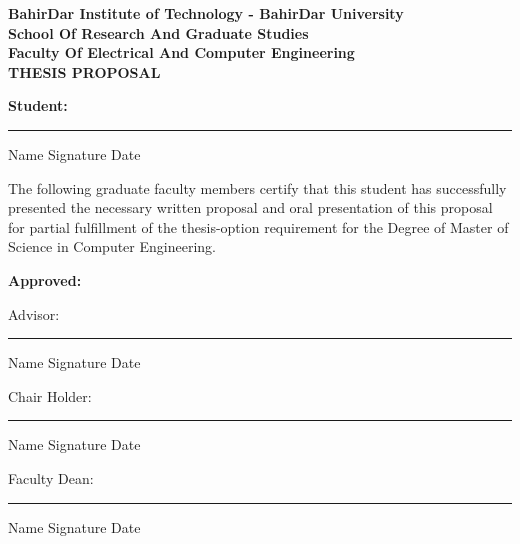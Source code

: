 \begin{center}
	{\large \bf BahirDar Institute of Technology - BahirDar University \\}
	{\large \bf School Of Research And Graduate Studies \\}
		\vspace{0.5\baselineskip}
	{\large \bf Faculty Of Electrical And Computer Engineering\\ }
	\vspace{2\baselineskip}
	{\large\bf THESIS PROPOSAL}
\end{center}

\begin{flushleft}
	{\bf Student: \\}
	\vspace{0.5\baselineskip}
	
	\noindent\rule{15cm}{0.4pt}
	Name \hfill Signature \hfill Date
	\vspace{\baselineskip}
	
	The following graduate faculty members certify that this student has successfully presented the necessary written proposal and oral presentation of this proposal for partial fulfillment of the thesis-option requirement for the Degree of Master of Science in Computer Engineering. 
	
	\vspace{1\baselineskip}
	
	{\bf Approved: \\}
	\vspace{0.5\baselineskip}
	
	Advisor:
	\vspace{0.5\baselineskip}
	\noindent\rule{15cm}{0.4pt}
	Name \hfill Signature \hfill Date
	\vspace{1\baselineskip}
	
	Chair Holder:
	\vspace{0.5\baselineskip}
	\noindent\rule{15cm}{0.4pt}
	Name \hfill Signature \hfill Date
	\vspace{1\baselineskip}
	
	Faculty Dean:
	\vspace{0.5\baselineskip}
	\noindent\rule{15cm}{0.4pt}
	Name \hfill Signature \hfill Date
	\vspace{\baselineskip}
\end{flushleft}
